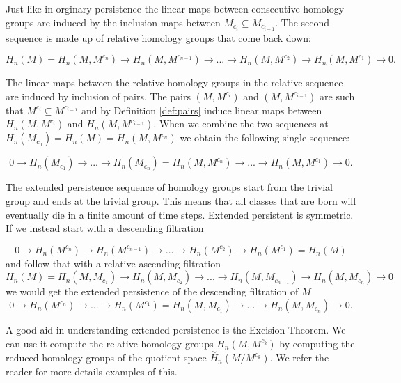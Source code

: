 Just like in orginary persistence the linear maps between consecutive homology groups are induced by the inclusion maps between $M_{c_i} \subseteq M_{c_{i+1}}$. The second sequence is made up of relative homology groups that come back down:

$$ H_n(M) = H_n(M, M^{c_n}) \rightarrow H_n(M, M^{c_{n-1}}) \rightarrow... \rightarrow H_n(M, M^{c_{2}}) \rightarrow H_n(M, M^{c_{1}}) \rightarrow 0.$$

The linear maps between the relative homology groups in the relative sequence are induced by inclusion of pairs. The pairs $(M, M^{c_i})$ and $(M, M^{c_{i-1}})$ are such that $M^{c_i} \subseteq M^{c_{i-1}}$ and by Definition \ref{def:pairs} induce linear maps between $H_n(M, M^{c_i})$ and $H_n(M, M^{c_{i-1}})$. When we combine the two sequences at $H_n(M_{c_n}) =  H_n(M) = H_n(M, M^{c_n})$ we obtain the following single sequence:

$$ 0 \rightarrow H_n(M_{c_1}) \rightarrow ... \rightarrow H_n(M_{c_n}) = H_n(M, M^{c_n}) \rightarrow ... \rightarrow H_n(M, M^{c_{1}}) \rightarrow 0.$$

The extended persistence sequence of homology groups start from the trivial group and ends at the trivial group. This means that all classes that are born will eventually die in a finite amount of time steps. Extended persistent is symmetric. If we instead start with a descending filtration

$$ 0 \rightarrow H_n(M^{c_n}) \rightarrow H_n(M^{c_{n-1}}) \rightarrow ... \rightarrow H_n(M^{c_{2}}) \rightarrow H_n(M^{c_1}) =  H_n(M) $$
and follow that with a relative ascending filtration
$$ H_n(M) = H_n(M, M_{c_1}) \rightarrow H_n(M, M_{c_{2}}) \rightarrow... \rightarrow H_n(M, M_{c_{n-1}}) \rightarrow H_n(M, M_{c_{n}}) \rightarrow 0 $$
we would get the extended persistence of the descending filtration of $M$
$$ 0 \rightarrow H_n(M^{c_n}) \rightarrow ... \rightarrow H_n(M^{c_1}) = H_n(M, M_{c_1}) \rightarrow ... \rightarrow H_n(M, M_{c_n}) \rightarrow 0.$$

A good aid in understanding extended persistence is the Excision Theorem. We can use it compute the relative homology groups $H_n(M, M^{c_k})$ by computing the reduced homology groups of the quotient space $\overset{\sim}{H}_n(M / M^{c_k})$. We refer the reader \cite{folded-molecules} for more details examples of this.


